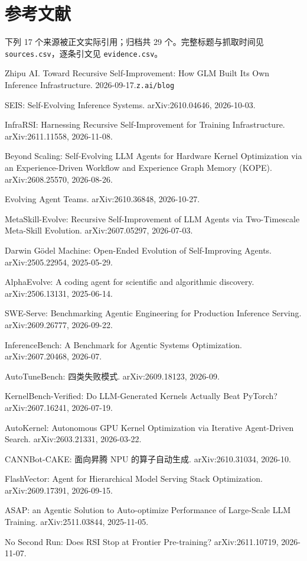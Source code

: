 \section*{参考文献}
\begingroup
\scriptsize
\setlength{\parindent}{0pt}
\setlength{\parskip}{1.4pt}
\begin{refs}
\noindent 下列 17 个来源被正文实际引用；归档共 29 个。完整标题与抓取时间见 \texttt{sources.csv}，逐条引文见 \texttt{evidence.csv}。\par
[1] Zhipu AI. Toward Recursive Self-Improvement: How GLM Built Its Own Inference Infrastructure. 2026-09-17.\hfill{\texttt{z.ai/blog}}\par
[2] SEIS: Self-Evolving Inference Systems. arXiv:2610.04646, 2026-10-03.\par
[3] InfraRSI: Harnessing Recursive Self-Improvement for Training Infrastructure. arXiv:2611.11558, 2026-11-08.\par
[4] Beyond Scaling: Self-Evolving LLM Agents for Hardware Kernel Optimization via an Experience-Driven Workflow and Experience Graph Memory (KOPE). arXiv:2608.25570, 2026-08-26.\par
[5] Evolving Agent Teams. arXiv:2610.36848, 2026-10-27.\par
[6] MetaSkill-Evolve: Recursive Self-Improvement of LLM Agents via Two-Timescale Meta-Skill Evolution. arXiv:2607.05297, 2026-07-03.\par
[7] Darwin G\"odel Machine: Open-Ended Evolution of Self-Improving Agents. arXiv:2505.22954, 2025-05-29.\par
[8] AlphaEvolve: A coding agent for scientific and algorithmic discovery. arXiv:2506.13131, 2025-06-14.\par
[9] SWE-Serve: Benchmarking Agentic Engineering for Production Inference Serving. arXiv:2609.26777, 2026-09-22.\par
[10] InferenceBench: A Benchmark for Agentic Systems Optimization. arXiv:2607.20468, 2026-07.\par
[11] AutoTuneBench: 四类失败模式. arXiv:2609.18123, 2026-09.\par
[12] KernelBench-Verified: Do LLM-Generated Kernels Actually Beat PyTorch? arXiv:2607.16241, 2026-07-19.\par
[13] AutoKernel: Autonomous GPU Kernel Optimization via Iterative Agent-Driven Search. arXiv:2603.21331, 2026-03-22.\par
[14] CANNBot-CAKE: 面向昇腾 NPU 的算子自动生成. arXiv:2610.31034, 2026-10.\par
[15] FlashVector: Agent for Hierarchical Model Serving Stack Optimization. arXiv:2609.17391, 2026-09-15.\par
[16] ASAP: an Agentic Solution to Auto-optimize Performance of Large-Scale LLM Training. arXiv:2511.03844, 2025-11-05.\par
[17] No Second Run: Does RSI Stop at Frontier Pre-training? arXiv:2611.10719, 2026-11-07.\par
\end{refs}
\endgroup
